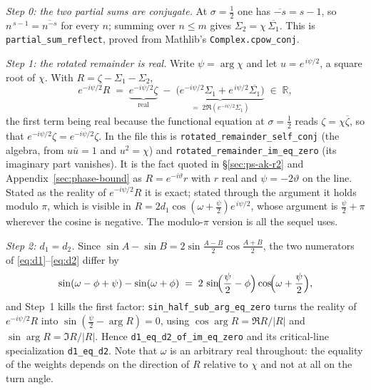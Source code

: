\documentclass[11pt]{article}
\theoremstyle{definition}
\begin{document}
\emph{Step 0: the two partial sums are conjugate.} At $\sigma=\tfrac12$ one has
$\overline{-s}=s-1$, so $n^{\,s-1}=\overline{n^{-s}}$ for every $n$; summing over
$n\le m$ gives $\Sigma_2=\chi\,\overline{\Sigma_1}$. This is
\texttt{partial\_sum\_reflect}, proved from Mathlib's \texttt{Complex.cpow\_conj}.

\emph{Step 1: the rotated remainder is real.} Write $\psi=\arg\chi$ and let
$u=e^{\,i\psi/2}$, a square root of $\chi$. With $R=\zeta-\Sigma_1-\Sigma_2$,
\begin{equation}\label{eq:lean-hinge}
e^{-i\psi/2}R
\;=\;
\underbrace{e^{-i\psi/2}\zeta}_{\text{real}}
\;-\;
\underbrace{\bigl(e^{-i\psi/2}\Sigma_1+e^{\,i\psi/2}\overline{\Sigma_1}\bigr)}_{=\;2\Re\left(e^{-i\psi/2}\Sigma_1\right)}
\;\in\;\mathbb{R},
\end{equation}
the first term being real because the functional equation at $\sigma=\tfrac12$
reads $\zeta=\chi\overline{\zeta}$, so that
$e^{-i\psi/2}\zeta=\overline{e^{-i\psi/2}\zeta}$. In the file this is
\texttt{rotated\_remainder\_self\_conj} (the algebra, from $u\bar u=1$ and
$u^2=\chi$) and \texttt{rotated\_remainder\_im\_eq\_zero} (its imaginary part
vanishes). It is the fact quoted in \S\ref{sec:ps-ak-r2} and
Appendix~\ref{sec:phase-bound} as $R=e^{-i\vartheta}r$ with $r$ real and
$\psi=-2\vartheta$ on the line. Stated as the reality of $e^{-i\psi/2}R$ it is
exact; stated through the argument it holds modulo $\pi$, which is visible in
$R=2d_1\cos(\omega+\tfrac\psi2)e^{\,i\psi/2}$, whose argument is
$\tfrac\psi2+\pi$ wherever the cosine is negative. The modulo-$\pi$ version is
all the sequel uses.

\emph{Step 2: $d_1=d_2$.} Since $\sin A-\sin B=2\sin\frac{A-B}{2}\cos\frac{A+B}{2}$,
the two numerators of \eqref{eq:d1}--\eqref{eq:d2} differ by
\begin{equation}\label{eq:lean-numerators}
\sin(\omega-\phi+\psi)-\sin(\omega+\phi)
\;=\;
2\,\sin\!\Bigl(\frac{\psi}{2}-\phi\Bigr)\cos\!\Bigl(\omega+\frac{\psi}{2}\Bigr),
\end{equation}
and Step~1 kills the first factor: \texttt{sin\_half\_sub\_arg\_eq\_zero} turns
the reality of $e^{-i\psi/2}R$ into $\sin(\tfrac\psi2-\arg R)=0$, using
$\cos\arg R=\Re R/|R|$ and $\sin\arg R=\Im R/|R|$. Hence
\texttt{d1\_eq\_d2\_of\_im\_eq\_zero} and its critical-line specialization
\texttt{d1\_eq\_d2}. Note that $\omega$ is an arbitrary real throughout: the
equality of the weights depends on the direction of $R$ relative to $\chi$ and
not at all on the turn angle.
\end{document}
